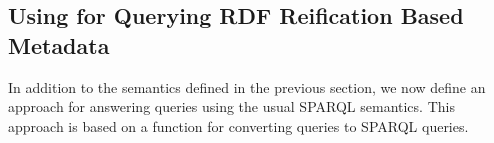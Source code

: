 % 
% 


\subsection{Using {\SPARQLplus} for Querying RDF Reification Based Metadata}

In addition to the {\SPARQLplus} semantics defined in the previous section, we now define an approach for answering {\SPARQLplus} queries using the usual SPARQL semantics. This approach is based on a function for converting {\SPARQLplus} queries to SPARQL queries.

